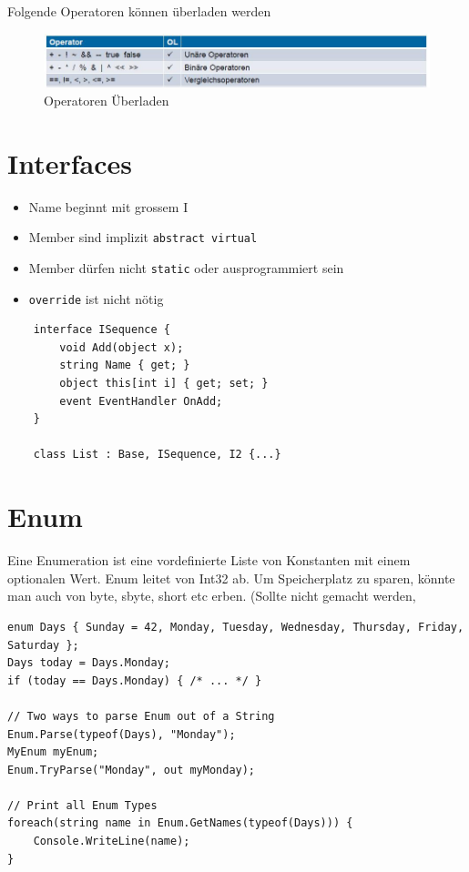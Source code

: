 Folgende Operatoren können überladen werden
\begin{figure}[h!]
\centering
\includegraphics[width=0.7\linewidth]{images/operator_overloading}
\caption{Operatoren Überladen}
\label{fig:operatoroverloading}
\end{figure}


\section{Interfaces}
\begin{itemize}
	\item Name beginnt mit grossem I	
	\item Member sind implizit \lstinline[language=C]|abstract virtual|
	\item Member dürfen nicht \lstinline|static| oder ausprogrammiert sein 
	\item \lstinline|override| ist nicht nötig
\end{itemize}
\begin{lstlisting}
	interface ISequence {
		void Add(object x);
		string Name { get; }
		object this[int i] { get; set; }
		event EventHandler OnAdd;
	}
	
	class List : Base, ISequence, I2 {...}
\end{lstlisting}

\section{Enum}
Eine Enumeration ist eine vordefinierte Liste von Konstanten mit einem optionalen Wert. Enum leitet von Int32 ab. Um Speicherplatz zu sparen, könnte man auch von byte, sbyte, short etc erben. (Sollte nicht gemacht werden, 
\begin{lstlisting}
enum Days { Sunday = 42, Monday, Tuesday, Wednesday, Thursday, Friday, Saturday };
Days today = Days.Monday;
if (today == Days.Monday) { /* ... */ }

// Two ways to parse Enum out of a String
Enum.Parse(typeof(Days), "Monday");
MyEnum myEnum;
Enum.TryParse("Monday", out myMonday);

// Print all Enum Types
foreach(string name in Enum.GetNames(typeof(Days))) {
	Console.WriteLine(name);
}
\end{lstlisting}

